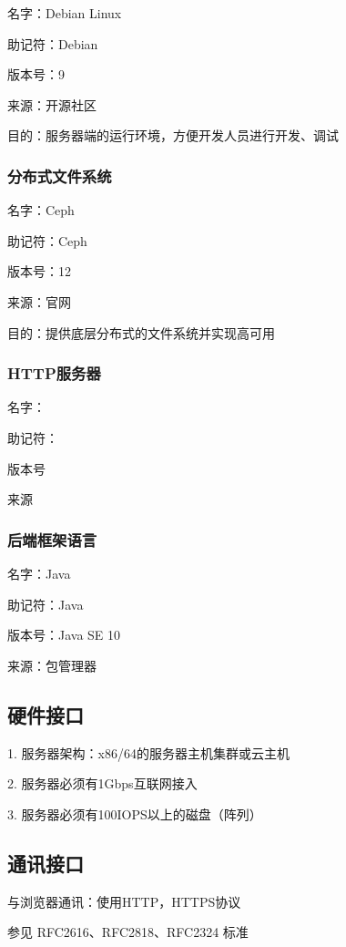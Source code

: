 名字：Debian Linux

助记符：Debian

版本号：9

来源：开源社区

目的：服务器端的运行环境，方便开发人员进行开发、调试

\subsubsection{分布式文件系统}

名字：Ceph

助记符：Ceph

版本号：12

来源：官网

目的：提供底层分布式的文件系统并实现高可用

\subsubsection{HTTP服务器}

名字：

助记符：

版本号

来源

\subsubsection{后端框架语言}

名字：Java

助记符：Java

版本号：Java SE 10

来源：包管理器 

\subsection{硬件接口}

1. 服务器架构：x86/64的服务器主机集群或云主机

2. 服务器必须有1Gbps互联网接入

3. 服务器必须有100IOPS以上的磁盘（阵列）

\subsection{通讯接口}

与浏览器通讯：使用HTTP，HTTPS协议

参见 RFC2616、RFC2818、RFC2324 标准


